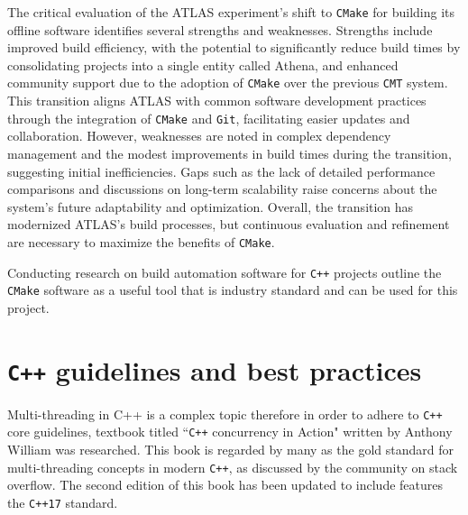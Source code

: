 The critical evaluation of the ATLAS experiment's shift to \texttt{CMake} for building its offline software identifies several strengths and weaknesses. Strengths include improved build efficiency, with the potential to significantly reduce build times by consolidating projects into a single entity called Athena, and enhanced community support due to the adoption of \texttt{CMake} over the previous \texttt{CMT} system. This transition aligns ATLAS with common software development practices through the integration of \texttt{CMake} and \texttt{Git}, facilitating easier updates and collaboration. However, weaknesses are noted in complex dependency management and the modest improvements in build times during the transition, suggesting initial inefficiencies. Gaps such as the lack of detailed performance comparisons and discussions on long-term scalability raise concerns about the system's future adaptability and optimization. Overall, the transition has modernized ATLAS’s build processes, but continuous evaluation and refinement are necessary to maximize the benefits of \texttt{CMake}.

Conducting research on build automation software for \texttt{C++} projects\cite{cmake_publication_1}\cite{cmake_publication_2} outline the \texttt{CMake} software as a useful tool that is industry standard and can be used for this project. 

\section{\texttt{C++} guidelines and best practices}

Multi-threading in C++ is a complex topic therefore in order to adhere to \texttt{C++} core guidelines,  textbook titled ``\texttt{C++} concurrency in Action" written by Anthony William was researched\cite{c++_concurrency_in_action}. This book is regarded by many as the gold standard for multi-threading concepts in modern \texttt{C++}, as discussed by the community on stack overflow\cite{c++_books_stackoverflow}. The second edition of this book has been updated to include features the \texttt{C++17} standard.

